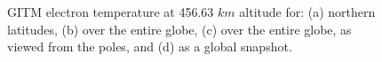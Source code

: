 \begin{figure}
\begin{center}
\caption{GITM electron temperature at 456.63 $km$ altitude for: (a) northern latitudes, (b) over the entire globe, (c) over the entire globe, as viewed from the poles, and (d) as a global snapshot.}
\label{gitm_3D_global_plots.fig}
\end{center}
\end{figure}

